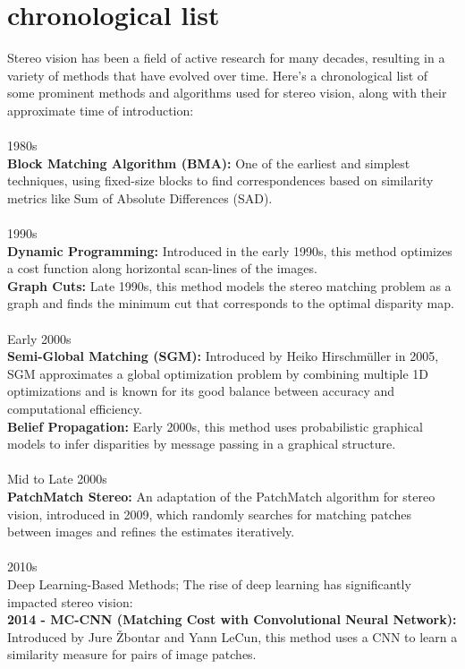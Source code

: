 \documentclass[22pt]{report}
\begin{document}
    \section{chronological list}
        Stereo vision has been a field of active research for many decades, resulting in a variety of methods that have evolved over time. Here’s a chronological list of some prominent methods and algorithms used for stereo vision, along with their approximate time of introduction:\\\\
        1980s\\
        \textbf{Block Matching Algorithm (BMA):} One of the earliest and simplest techniques, using fixed-size blocks to find correspondences based on similarity metrics like Sum of Absolute Differences (SAD).\\\\
        1990s\\
        \textbf{Dynamic Programming:} Introduced in the early 1990s, this method optimizes a cost function along horizontal scan-lines of the images.\\
        \textbf{Graph Cuts:} Late 1990s, this method models the stereo matching problem as a graph and finds the minimum cut that corresponds to the optimal disparity map.\\\\
        Early 2000s\\
        \textbf{Semi-Global Matching (SGM):} Introduced by Heiko Hirschmüller in 2005, SGM approximates a global optimization problem by combining multiple 1D optimizations and is known for its good balance between accuracy and computational efficiency.\\
        \textbf{Belief Propagation:} Early 2000s, this method uses probabilistic graphical models to infer disparities by message passing in a graphical structure.\\\\
        Mid to Late 2000s\\
        \textbf{PatchMatch Stereo:} An adaptation of the PatchMatch algorithm for stereo vision, introduced in 2009, which randomly searches for matching patches between images and refines the estimates iteratively.\\\\
        2010s\\
        Deep Learning-Based Methods; The rise of deep learning has significantly impacted stereo vision:\\
        \textbf{2014 - MC-CNN (Matching Cost with Convolutional Neural Network):} Introduced by Jure Žbontar and Yann LeCun, this method uses a CNN to learn a similarity measure for pairs of image patches.\\
\end{document}
